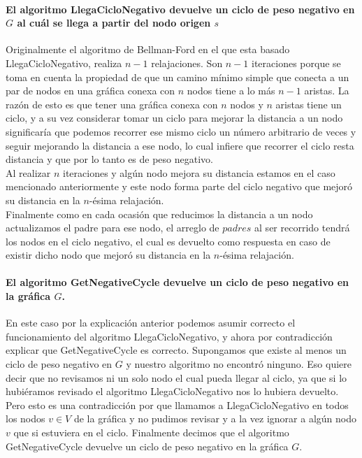 \documentclass[12pt]{article}
\begin{document}
\paragraph{El algoritmo LlegaCicloNegativo devuelve un ciclo de peso negativo en $G$ al cuál se llega a partir del nodo origen $s$}
Originalmente el algoritmo de Bellman-Ford en el que esta basado LlegaCicloNegativo, realiza $n-1$ relajaciones. Son $n-1$ iteraciones porque se toma en cuenta la propiedad de que un camino mínimo simple que conecta a un par de nodos en una gráfica conexa con $n$ nodos tiene a lo más $n-1$ aristas. La razón de esto es que tener una gráfica conexa con $n$ nodos y $n$ aristas tiene un ciclo, y a su vez considerar tomar un ciclo para mejorar la distancia a un nodo significaría que podemos recorrer ese mismo ciclo un número arbitrario de veces y seguir mejorando la distancia a ese nodo, lo cual infiere que recorrer el ciclo resta distancia y que por lo tanto es de peso negativo.\\
Al realizar $n$ iteraciones y algún nodo mejora su distancia estamos en el caso mencionado anteriormente y este nodo forma parte del ciclo negativo que mejoró su distancia en la $n$-ésima relajación.\\
Finalmente como en cada ocasión que reducimos la distancia a un nodo actualizamos el padre para ese nodo, el arreglo de $padres$ al ser recorrido tendrá los nodos en el ciclo negativo, el cual es devuelto como respuesta en caso de existir dicho nodo que mejoró su distancia en la $n$-ésima relajación.\\
\paragraph{El algoritmo GetNegativeCycle devuelve un ciclo de peso negativo en la gráfica $G$.}
En este caso por la explicación anterior podemos asumir correcto el funcionamiento del algoritmo LlegaCicloNegativo, y ahora por contradicción explicar que GetNegativeCycle es correcto. 
Supongamos que existe al menos un ciclo de peso negativo en $G$ y nuestro algoritmo no encontró ninguno. Eso quiere decir que no revisamos ni un solo nodo el cual pueda llegar al ciclo, ya que si lo hubiéramos revisado el algoritmo LlegaCicloNegativo nos lo hubiera devuelto.
Pero esto es una contradicción por que llamamos a LlegaCicloNegativo en todos los nodos $v\in V$ de la gráfica y no pudimos revisar y a la vez ignorar a algún nodo $v$ que si estuviera en el ciclo. Finalmente decimos que el algoritmo GetNegativeCycle devuelve un ciclo de peso negativo en la gráfica $G$.
\end{document}

